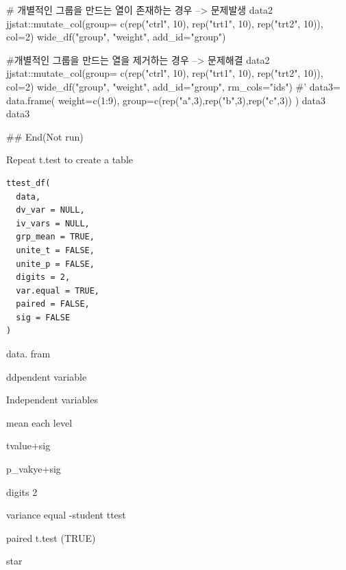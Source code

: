 \documentclass[a4paper]{book}
\begin{document}
\begin{Examples}
\begin{ExampleCode}
# 개별적인 그룹을 만드는 열이 존재하는 경우 --> 문제발생
data2 %
    jjstat::mutate_col(group= c(rep("ctrl", 10),
          rep("trt1", 10), rep("trt2", 10)), col=2)%
          wide_df("group", "weight", add_id="group")

#개별적인 그룹을 만드는 열을 제거하는 경우 --> 문제해결
data2 %
  jjstat::mutate_col(group= c(rep("ctrl", 10),
  rep("trt1", 10), rep("trt2", 10)),  col=2)%
  wide_df("group", "weight", add_id="group", rm_cols="ids") %
#'
data3= data.frame(
  weight=c(1:9),
  group=c(rep("a",3),rep("b",3),rep("c",3))
)
data3
data3 %


## End(Not run)
\end{ExampleCode}
\end{Examples}

%
\begin{Description}
Repeat t.test to create a table
\end{Description}
%
\begin{Usage}
\begin{verbatim}
ttest_df(
  data,
  dv_var = NULL,
  iv_vars = NULL,
  grp_mean = TRUE,
  unite_t = FALSE,
  unite_p = FALSE,
  digits = 2,
  var.equal = TRUE,
  paired = FALSE,
  sig = FALSE
)
\end{verbatim}
\end{Usage}
%
\begin{Arguments}
\begin{ldescription}
\item[\code{data}] data. fram

\item[\code{dv\_var}] ddpendent variable

\item[\code{iv\_vars}] Independent variables

\item[\code{grp\_mean}] mean each level

\item[\code{unite\_t}] tvalue+sig

\item[\code{unite\_p}] p\_vakye+sig

\item[\code{digits}] digits 2

\item[\code{var.equal}] variance equal -student ttest

\item[\code{paired}] paired t.test (TRUE)

\item[\code{sig}] star
\end{ldescription}
\end{Arguments}
\end{document}

